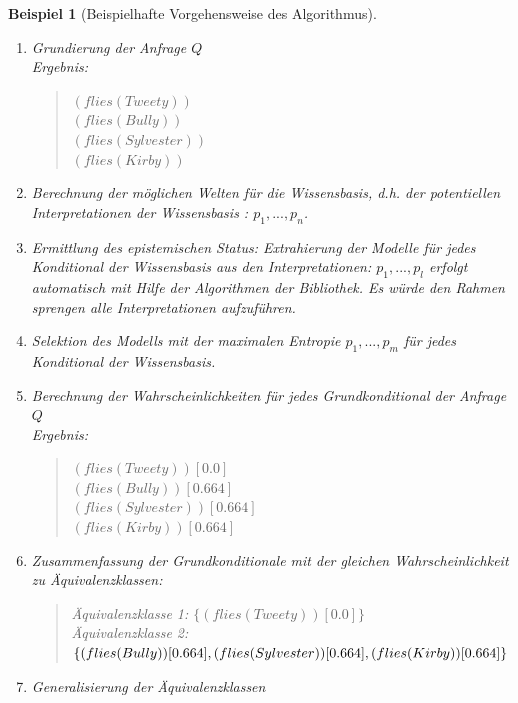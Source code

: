 \documentclass[draft]{scrreprt}
\newtheorem{Bsp}{Beispiel}[section]
\begin{document}
{\begin{Bsp}[Beispielhafte Vorgehensweise des Algorithmus]
\begin{enumerate}
		\item Grundierung der Anfrage $ Q $\\
		Ergebnis:
		\begin{quote}
			$ (flies(Tweety))$\\
			$ (flies(Bully))$\\
			$ (flies(Sylvester))$\\
			$ (flies(Kirby))$\\
		\end{quote}
		\item Berechnung der möglichen Welten für die Wissensbasis, d.h. der potentiellen Interpretationen der Wissensbasis : $ p_1, ..., p_n $.
		\item Ermittlung des epistemischen Status: Extrahierung der Modelle für jedes Konditional der Wissensbasis aus den Interpretationen: $ p_1, ..., p_l $ erfolgt automatisch mit Hilfe der Algorithmen der Bibliothek. Es würde den Rahmen sprengen alle Interpretationen aufzuführen.\\
		\item Selektion des Modells mit der maximalen Entropie $p_1, ..., p_m$ für jedes Konditional der Wissensbasis.
		\item Berechnung der Wahrscheinlichkeiten für jedes Grundkonditional der Anfrage $ Q $\\
		Ergebnis:
		\begin{quote}
			$(flies(Tweety))[0.0]$\\
			$(flies(Bully))[0.664]$\\
			$(flies(Sylvester))[0.664]$\\
			$(flies(Kirby))[0.664]$
		\end{quote}
		\item Zusammenfassung der Grundkonditionale mit der gleichen Wahrscheinlichkeit zu Äquivalenzklassen:
		
		\begin{quote}
			Äquivalenzklasse 1: $\{(flies(Tweety))[0.0]\}$\\
			Äquivalenzklasse 2: $\{(flies(Bully))[0.664], (flies(Sylvester))[0.664],\\ (flies(Kirby))[0.664]\}$
		\end{quote}
		
		\item Generalisierung der Äquivalenzklassen
		\begin{quote}
			

\end{quote}
\end{enumerate}
\end{Bsp}}
\end{document}
